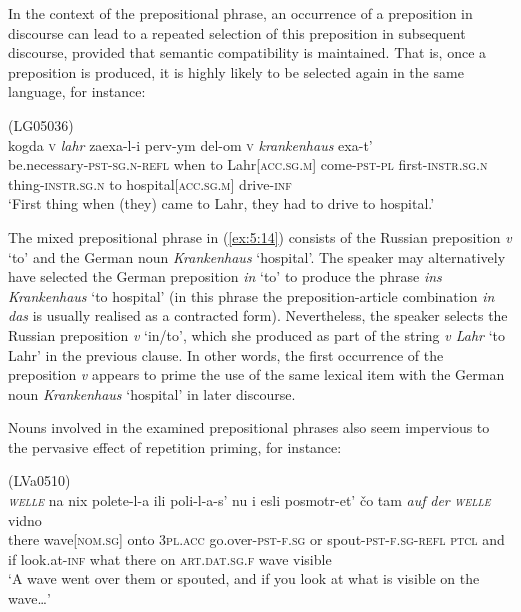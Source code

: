 In the context of the prepositional phrase, an occurrence of a preposition in discourse can lead to a repeated selection of this preposition in subsequent discourse, provided that semantic compatibility is maintained. That is, once a preposition is produced, it is highly likely to be selected again in the same language, for instance:

\ea
\label{ex:5:14}
(LG05036)\\
 {kogda} {\textsc{v}} \textit{lahr} {zaexa-l-i} {perv-ym} {del-om} {\textsc{v}} \textit{krankenhaus} {exa-t'}\\
	be.necessary-\textsc{pst-sg.n-refl} when to Lahr[\textsc{acc.sg.m}] come-\textsc{pst-pl} first-\textsc{instr.sg.n} thing-\textsc{instr.sg.n} to hospital[\textsc{acc.sg.m}] drive-\textsc{inf}\\
\glt `First thing when (they) came to Lahr, they had to drive to hospital.'
\z

\noindent The mixed prepositional phrase in (\ref{ex:5:14}) consists of the Russian preposition \textit{v} `to' and the German noun \textit{Krankenhaus} `hospital'. The speaker may alternatively have selected the German preposition \textit{in} `to' to produce the phrase \textit{ins Krankenhaus} `to hospital' (in this phrase the preposition-article combination \textit{in das} is usually realised as a contracted form). Nevertheless, the speaker selects the Russian preposition \textit{v} `in/to', which she produced as part of the string \textit{v Lahr} `to Lahr' in the previous clause. In other words, the first occurrence of the preposition \textit{v} appears to prime the use of the same lexical item with the German noun \textit{Krankenhaus} `hospital' in later discourse.

Nouns involved in the examined prepositional phrases also seem impervious to the pervasive effect of repetition priming, for instance:

\ea
\label{ex:5:15}
(LVa0510)\\
 \textit{\textsc{welle}} {na} {nix} {polete-l-a} {ili} {poli-l-a-s'} {nu} {i} {esli} {posmotr-et'} {čo} {tam} \textit{auf} \textit{der} \textit{\textsc{welle}} {vidno}\\ 
	{there} wave[\textsc{nom.sg}] onto 3\textsc{pl.acc} go.over-\textsc{pst-f.sg} or spout-\textsc{pst-f.sg-refl} \textsc{ptcl} and if look.at-\textsc{inf} what there on \textsc{art.dat.sg.f} wave visible\\
\glt `A wave went over them or spouted, and if you look at what is visible on the wave\dots{}'
\z


